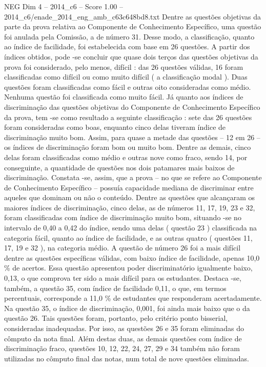 \begin{textsample}{NEG Dim 4 – 2014\_c6 – Score 1.00 – 2014\_c6/enade\_2014\_eng\_amb\_c63c648bd8.txt}
Dentre as questões objetivas da parte da prova relativa ao Componente de Conhecimento Específico, uma questão foi anulada pela Comissão, a de número 31.
Desse modo, a classificação, quanto ao índice de facilidade, foi estabelecida com base em 26 questões.
A partir dos índices obtidos, pode -se concluir que quase dois terços das questões objetivas da prova foi considerado, pelo menos, difícil : das 26 questões válidas, 16 foram classificadas como difícil ou como muito difícil ( a classificação modal ).
Duas questões foram classificadas como fácil e outras oito consideradas como médio.
Nenhuma questão foi classificada como muito fácil.
Já quanto aos índices de discriminação das questões objetivas do Componente de Conhecimento Específico da prova, tem -se como resultado a seguinte classificação : sete das 26 questões foram consideradas como boas, enquanto cinco delas tiveram índice de discriminação muito bom.
Assim, para quase a metade das questões – 12 em 26 – os índices de discriminação foram bom ou muito bom.
Dentre as demais, cinco delas foram classificadas como médio e outras nove como fraco, sendo 14, por conseguinte, a quantidade de questões nos dois patamares mais baixos de discriminação.
Constata -se, assim, que a prova – no que se refere ao Componente de Conhecimento Específico – possuía capacidade mediana de discriminar entre aqueles que dominam ou não o conteúdo.
Dentre as questões que alcançaram os maiores índices de discriminação, cinco delas, as de números 11, 17, 19, 23 e 32, foram classificadas com índice de discriminação muito bom, situando -se no intervalo de 0,40 a 0,42 do índice, sendo uma delas ( questão 23 ) classificada na categoria fácil, quanto ao índice de facilidade, e as outras quatro ( questões 11, 17, 19 e 32 ), na categoria médio.
A questão de número 26 foi a mais difícil dentre as questões específicas válidas, com baixo índice de facilidade, apenas 10,0 \% de acertos.
Essa questão apresentou poder discriminatório igualmente baixo, 0,13, o que comprova ter sido a mais difícil para os estudantes.
Destaca -se, também, a questão 35, com índice de facilidade 0,11, o que, em termos percentuais, corresponde a 11,0 \% de estudantes que responderam acertadamente.
Na questão 35, o índice de discriminação, 0,001, foi ainda mais baixo que o da questão 26.
Tais questões foram, portanto, pelo critério ponto bisserial, consideradas inadequadas.
Por isso, as questões 26 e 35 foram eliminadas do cômputo da nota final.
Além destas duas, as demais questões com índice de discriminação fraco, questões 10, 12, 22, 24, 27, 29 e 34 também não foram utilizadas no cômputo final das notas, num total de nove questões eliminadas.

\end{textsample}
